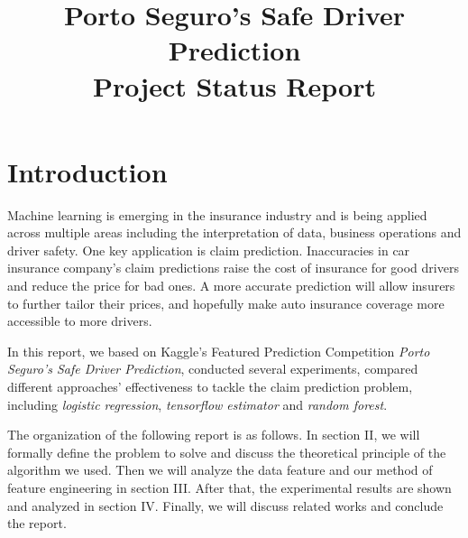 \documentclass[conference,draft]{IEEEtran}
\begin{document}
\title{Porto Seguro's Safe Driver Prediction\\Project Status Report}
\author{
}

\maketitle

\section{Introduction}


Machine learning is emerging in the insurance industry and is being applied
across multiple areas including the interpretation of data, business operations
and driver safety. One key application is claim prediction. Inaccuracies in car
insurance company's claim predictions raise the cost of insurance for good
drivers and reduce the price for bad ones. A more accurate prediction will
allow insurers to further tailor their prices, and hopefully make auto
insurance coverage more accessible to more drivers.

In this report, we based on Kaggle's Featured Prediction Competition
\emph{Porto Seguro's Safe Driver Prediction}\cite{kaggle}, conducted several
experiments, compared different approaches' effectiveness to tackle the claim
prediction problem, including \emph{logistic regression}, \emph{tensorflow
estimator} and \emph{random forest}.

The organization of the following report is as follows. In section II, we will
formally define the problem to solve and discuss the theoretical principle of
the algorithm we used. Then we will analyze the data feature and our method of
feature engineering in section III. After that, the experimental results are
shown and analyzed in section IV. Finally, we will discuss related works and
conclude the report.
\end{document}
